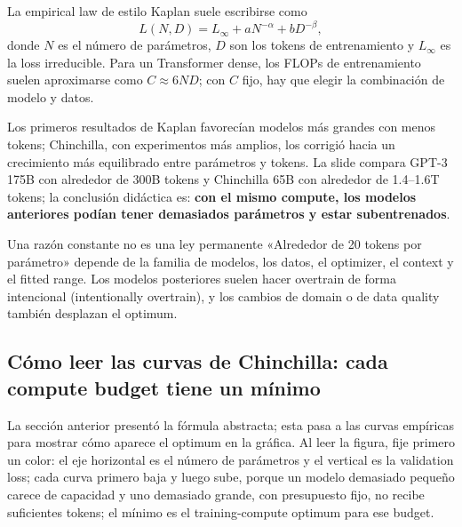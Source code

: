 La empirical law de estilo Kaplan suele escribirse como
\[
L(N,D)=L_\infty+aN^{-\alpha}+bD^{-\beta},
\]
donde $N$ es el número de parámetros, $D$ son los tokens de entrenamiento y $L_\infty$ es la loss irreducible. Para un Transformer dense, los FLOPs de entrenamiento suelen aproximarse como $C\approx 6ND$; con $C$ fijo, hay que elegir la combinación de modelo y datos.



Los primeros resultados de Kaplan favorecían modelos más grandes con menos tokens; Chinchilla, con experimentos más amplios, los corrigió hacia un crecimiento más equilibrado entre parámetros y tokens. La slide compara GPT-3 175B con alrededor de 300B tokens y Chinchilla 65B con alrededor de 1.4--1.6T tokens; la conclusión didáctica es: \textbf{con el mismo compute, los modelos anteriores podían tener demasiados parámetros y estar subentrenados}.

\begin{warningbox}{Una razón constante no es una ley permanente}
«Alrededor de 20 tokens por parámetro» depende de la familia de modelos, los datos, el optimizer, el context y el fitted range. Los modelos posteriores suelen hacer overtrain de forma intencional (intentionally overtrain), y los cambios de domain o de data quality también desplazan el optimum.
\end{warningbox}


\subsection{Cómo leer las curvas de Chinchilla: cada compute budget tiene un mínimo}

La sección anterior presentó la fórmula abstracta; esta pasa a las curvas empíricas para mostrar cómo aparece el optimum en la gráfica. Al leer la figura, fije primero un color: el eje horizontal es el número de parámetros y el vertical es la validation loss; cada curva primero baja y luego sube, porque un modelo demasiado pequeño carece de capacidad y uno demasiado grande, con presupuesto fijo, no recibe suficientes tokens; el mínimo es el training-compute optimum para ese budget.

